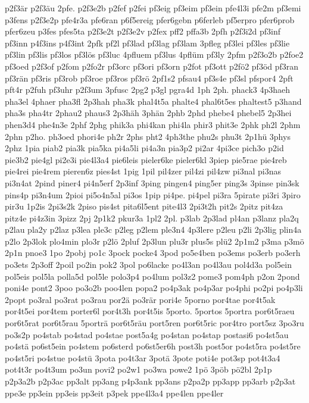 {p2f3är
p2f3äu
2pfe.
p2f3e2b
p2fef
p2fei
pf3eig
pf3eim
pf3ein
pfe4l3i
pfe2m
pf3emi
p3fens
p2f3e2p
pfe4r3a
pfe6ran
p6f5ereig
pfer6gebn
p6ferleb
pf5erpro
pfer6prob
pfer6zeu
p3fes
pfes5ta
p2f3e2t
p2f3e2v
p2fex
pff2
pffa3b
2pfh
p2f3i2d
pf3inf
pf3inn
p4f3ins
p4f3int
2pfk
pf2l
pf3lad
pf3lag
pf3lam
3pfleg
pf3lei
pf3les
pf3lie
pf3lin
pf3lis
pf3los
pf3lös
pf3luc
4pfluem
pf3lus
4pflüm
pf3ly
2pfm
p2f3o2b
p2foe2
pf3oed
p2f3of
p2fom
p2fo2r
pf3orc
pf3ori
pf3orn
p2fot
pf3ott
p2fö2
pf3öd
pf3ran
pf3rän
pf3ris
pf3rob
pf3roe
pf3ros
pf3rö
2pf1s2
pfsau4
pf3s4e
pf3sl
pfspor4
2pft
pft4r
p2fuh
pf3uhr
p2f3um
3pfusc
2pg2
p3gl
pgra4d
1ph
2ph.
phack3
4p3haeh
pha3el
4phaer
pha3fl
2p3hah
pha3k
phal4t5a
phalte4
phal6t5es
phaltest5
p3hand
pha3s
pha4tr
2phau2
phaus3
2p3häh
3phän
2phb
2phd
phebe4
phebel5
2p3hei
phen3d4
phe4n3e
2phf
2phg
phik3a
phi4kan
phi4la
phir3
phit3e
2phk
ph2l
2phm
2phn
p2ho.
ph3oed
phori4e
ph2r
2phs
pht2
4ph3the
phu2s
phu3t
2p1hü
3phys
2phz
1pia
piab2
pia3k
pia5ka
pi4a5li
pi4a3n
pia3p2
pi2ar
4pi3ce
pich3o
p2id
pie3b2
pie4gl
pi2e3i
pie4l3a4
pie6leis
pieler6ke
pieler6kl
3piep
pie5rae
pie4reb
pie4rei
pie4rem
pieren6z
pies4st
1pig
1pil
pil4zer
pil4zi
pil4zw
pi3nal
pi3nas
pi3n4at
2pind
piner4
pi4n5erf
2p3inf
3ping
pingen4
ping5er
ping3s
3pinse
pin3sk
pins4p
pi3n4um
2pioi
pi5o4n5al
pi3os
1pip
pi4pe.
pi4pel
pi3ra
5pirate
pi3ri
3piro
pir3u
1p2is
2pi3s2k
2piso
pis4st
pita6l5ent
pite4l3
2pi3t2h
pit2s
2pitz
pit4za
pitz4e
pi4z3in
3pizz
2pj
2p1k2
pkur3a
1pl2
2pl.
p3lab
2p3lad
pl4an
p3lanz
pla2q
p2lau
pla2y
p2laz
p3lea
ple3c
p2leg
p2lem
ple3n4
4p3lere
p2leu
p2li
2p3lig
plin4a
p2lo
2p3lok
plo4min
plo3r
p2lö
2pluf
2p3lun
plu3r
plus5s
plü2
2p1m2
p3ma
p3mö
2p1n
pnoe3
1po
2pobj
po1c
3pock
pocke4
3pod
po5e4ben
po3ems
po3erb
po3erh
po3ets
2p3off
2poil
po2in
pok2
3pol
po6lacke
po4l3an
po4l3au
pol4d3a
pol5ein
pol5eis
pol5la
polla5d
pol5le
polo3p4
po4lum
pol3z2
pome3
pom4ph
p2on
2pond
poni4e
pont2
3poo
po3o2b
poo4len
popa2
po4p3ak
po4p3ar
po4phi
po2pi
po4p3li
2popt
po3ral
po3rat
po3rau
por2ä
po3rär
pori4e
5porno
por4tae
por4t5ak
por4t5ei
por4tem
porter6l
por4t3h
por4t5is
5porto.
5portos
5portra
por6t5raeu
por6t5rat
por6t5rau
5porträ
por6t5räu
port5ren
por6t5ric
por4tro
port5sz
3po3ru
po3s2p
po4stab
po4stad
po4stae
post5a4g
po4stan
po4stap
postasi6
po4st5au
po4stä
po6st5ein
po4stem
po6sterd
po6st5er6h
post3h
post5or
po4st5ra
po4st5re
po4st5ri
po4stue
po4stü
3pota
po4t3ar
3potä
3pote
poti4e
pot3sp
pot4t3a4
pot4t3r
po4t3um
po3un
povi2
po2w1
po3wa
powe2
1pö
3pöb
pö2bl
2p1p
p2p3a2b
p2p3ac
pp3alt
pp3ang
p4p3ank
pp3ans
p2pa2p
pp3app
pp3arb
p2p3at
ppe3e
pp3ein
pp3eis
pp3eit
p3pek
ppe4l3a4
ppe4len
ppe4ler
}
